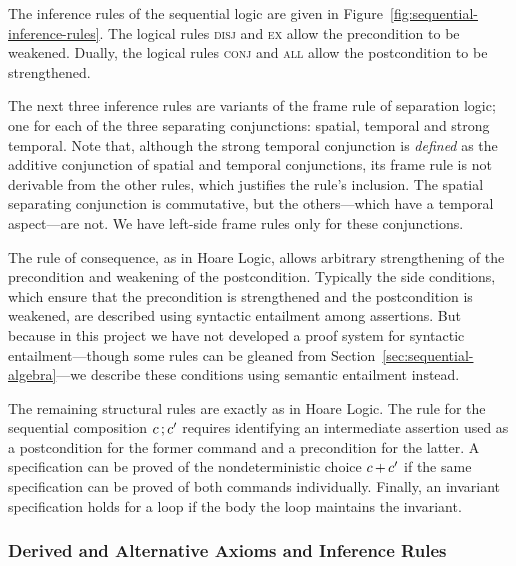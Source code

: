 \documentclass[11pt]{report}
\begin{document}
The inference rules of the sequential logic are given in Figure~\ref{fig:sequential-inference-rules}. The logical rules \textsc{disj} and \textsc{ex} allow the precondition to be weakened. Dually, the logical rules \textsc{conj} and \textsc{all} allow the postcondition to be strengthened. 

The next three inference rules are variants of the frame rule of separation logic; one for each of the three separating conjunctions: spatial, temporal and strong temporal. Note that, although the strong temporal conjunction is \emph{defined} as the additive conjunction of spatial and temporal conjunctions, its frame rule is not derivable from the other rules, which  justifies the rule's inclusion. The spatial separating conjunction is commutative, but the others---which have a temporal aspect---are not. We have left-side frame rules only for these conjunctions. 

The rule of consequence, as in Hoare Logic, allows arbitrary strengthening of the precondition and weakening of the postcondition. Typically the side conditions, which ensure that the precondition is strengthened and 
the postcondition is weakened, are described using syntactic entailment among assertions. But because in this project we have not developed a proof system for syntactic entailment---though some rules can be gleaned from Section~\ref{sec:sequential-algebra}---we describe these conditions using semantic entailment instead. 

The remaining structural rules are exactly as in Hoare Logic. The rule for the sequential composition $c \operatorname{;} c'$ requires identifying an intermediate assertion used as a postcondition for the former command and a precondition for the latter. A specification can be proved of the nondeterministic choice $c \operatorname{+} c'$ if the same specification can be proved of both commands individually. Finally, an invariant specification holds for a loop if the body the loop maintains the invariant. 

\subsubsection{Derived and Alternative Axioms and Inference Rules}
\end{document}
